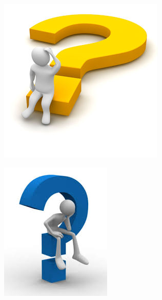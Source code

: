 \documentclass{beamer}
\begin{document}
\begin{frame}
	\begin{figure}
	\includegraphics{QandA/QandA6}
	\end{figure}
\end{frame}

\begin{frame}
	\begin{figure}
	\includegraphics{QandA/QandA7}
	\end{figure}
\end{frame}
\end{document}
